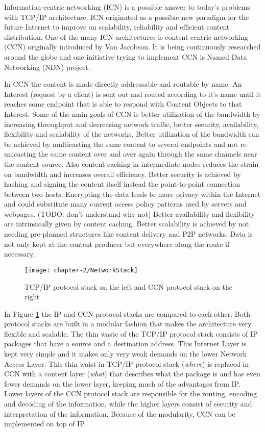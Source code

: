 Information-centric networking (ICN) is a possible answer to today's problems with TCP/IP architecture. ICN originated as a possible new paradigm for the future Internet to improve on scalability, reliability and efficient content distribution. One of the many ICN architectures is content-centric networking (CCN) originally introduced by Van Jacobson. It is being continuously researched around the globe and one initiative trying to implement CCN is Named Data Networking (NDN) project.

\vspace{5mm} %

In CCN the content is made directly addressable and routable by name. An Interest (request by a client) is sent out and routed according to it's name until it reaches some endpoint that is able to respond with Content Objects to that Interest. Some of the main goals of CCN is better utilization of the bandwidth by increasing throughput and decreasing network traffic, better security, availability, flexibility and scalability of the networks. Better utilization of the bandwidth can be achieved by multicasting the same content to several endpoints and not re-unicasting the same content over and over again through the same channels near the content source. Also content caching in intermediate nodes reduces the strain on bandwidth and increases overall efficiency. Better security is achieved by hashing and signing the content itself instead the point-to-point connection between two hosts. Encrypting the data leads to more privacy within the Internet and could substitute many current access policy patterns used by servers and webpages. (TODO: don't understand why not) Better availability and flexibility are intrinsically given by content caching. Better scalability is achieved by not needing pre-planned structures like content delivery and P2P networks. Data is not only kept at the content producer but everywhere along the route if necessary.

\begin{figure}[H]
  \centering
  \texttt{[image: chapter-2/NetworkStack]}
  \caption{TCP/IP protocol stack on the left and CCN protocol stack on the right}
  \label{fig:NetworkStack}
\end{figure}

In Figure \ref{fig:NetworkStack} the IP and CCN protocol stacks are compared to each other. Both protocol stacks are built in a modular fashion that makes the architecture very flexible and scalable. The thin waste of the TCP/IP protocol stack consists of IP packages that have a source and a destination address. This Internet Layer is kept very simple and it makes only very weak demands on the lower Network Access Layer. This thin waist in TCP/IP protocol stack (\emph{where}) is replaced in CCN with a content layer (\emph{what}) that describes what the package is and has even fewer demands on the lower layer, keeping much of the advantages from IP. Lower layers of the CCN protocol stack are responsible for the routing, encoding and decoding of the information, while the higher layers consist of security and interpretation of the information. Because of the modularity, CCN can be implemented on top of IP.

